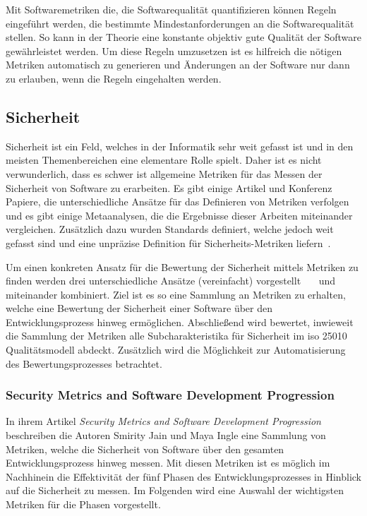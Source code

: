 \documentclass[12pt, a4paper, ngerman]{article}
\begin{document}
Mit Softwaremetriken die,
die Softwarequalität quantifizieren
können Regeln eingeführt werden,
die bestimmte Mindestanforderungen an die Softwarequalität stellen.
So kann in der Theorie eine konstante objektiv gute Qualität der Software
gewährleistet werden.
Um diese Regeln umzusetzen ist es hilfreich
die nötigen Metriken automatisch zu generieren
und Änderungen an der Software nur dann zu erlauben,
wenn die Regeln eingehalten werden.

\subsection{Sicherheit}

Sicherheit ist ein Feld, welches in der Informatik sehr weit gefasst ist und in den meisten Themenbereichen eine elementare Rolle spielt.
Daher ist es nicht verwunderlich, dass es schwer ist allgemeine Metriken für das Messen der Sicherheit von Software zu erarbeiten.
Es gibt einige Artikel und Konferenz Papiere, die unterschiedliche Ansätze für das Definieren von Metriken verfolgen und es gibt einige 
Metaanalysen, die die Ergebnisse dieser Arbeiten miteinander vergleichen. 
Zusätzlich dazu wurden Standards definiert, 
welche jedoch weit gefasst sind und eine unpräzise Definition für Sicherheits-Metriken liefern~\cite{MeFlado_Fernández-Medina_Piattini_2010}.

Um einen konkreten Ansatz für die Bewertung der Sicherheit mittels Metriken zu finden werden 
drei unterschiedliche Ansätze (vereinfacht) vorgestellt~\cite{Jain2014SecurityMA}~\cite{Chowdhury_Chan_Zulkernine_2008}~\cite{Wang_Wang_Guo_Xia_2009} und 
miteinander kombiniert.
Ziel ist es so eine Sammlung an Metriken zu erhalten, 
welche eine Bewertung der Sicherheit einer Software über den Entwicklungsprozess hinweg ermöglichen. 
Abschließend wird bewertet, inwieweit die Sammlung der Metriken alle Subcharakteristika für Sicherheit im \ac{iso} 25010 Qualitätsmodell abdeckt.
Zusätzlich wird die Möglichkeit zur Automatisierung des Bewertungsprozesses betrachtet.

\subsubsection{Security Metrics and Software Development Progression~\cite{Jain2014SecurityMA}}

In ihrem Artikel \emph{Security Metrics and Software Development Progression} beschreiben die Autoren Smirity Jain und Maya Ingle eine Sammlung von Metriken, 
welche die Sicherheit von Software über den gesamten Entwicklungsprozess hinweg messen.
Mit diesen Metriken ist es möglich im Nachhinein die Effektivität der fünf Phasen des Entwicklungsprozesses in Hinblick auf die Sicherheit zu messen.
Im Folgenden wird eine Auswahl der wichtigsten Metriken für die Phasen vorgestellt.
\end{document}
